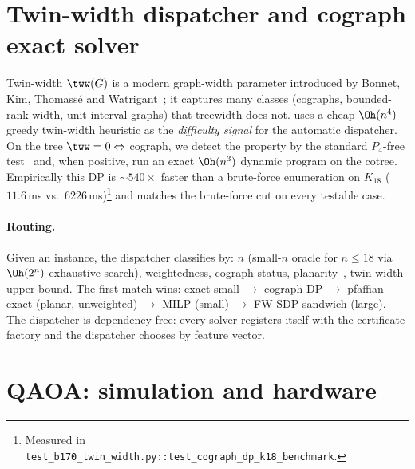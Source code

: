 \documentclass{article}
\begin{document}
\section{Twin-width dispatcher and cograph exact solver}
\label{sec:dispatcher}

Twin-width $\tww(G)$ is a modern graph-width parameter
introduced by Bonnet, Kim, Thomass{\'e} and
Watrigant~\cite{bonnet2022twin}; it captures many classes (cographs,
bounded-rank-width, unit interval graphs) that treewidth does not.
\ZornQ uses a cheap $\Oh(n^4)$ greedy twin-width heuristic as the
\emph{difficulty signal} for the automatic dispatcher. On the tree
$\tww = 0 \Leftrightarrow$ cograph, we detect the property by the
standard $P_4$-free test~\cite{corneil1981linear} and, when positive,
run an exact $\Oh(n^3)$ \MaxCut dynamic program on the cotree.
Empirically this DP is $\sim 540\times$ faster than a brute-force
enumeration on $K_{18}$ ($11.6$\,ms vs.\ $6226$\,ms)\footnote{Measured in \texttt{test\_b170\_twin\_width.py::test\_cograph\_dp\_k18\_benchmark}.} and matches the
brute-force cut on every testable case.

\begin{sloppypar}
\paragraph{Routing.} Given an instance, the dispatcher classifies by:
$n$ (small-$n$ oracle for $n \le 18$ via $\Oh(2^n)$ exhaustive search),
weightedness, cograph-status, planarity~\cite{kasteleyn1963dimer,hadlock1975finding},
twin-width upper bound. The first match wins: exact-small $\to$
cograph-DP $\to$ pfaffian-exact (planar, unweighted) $\to$ MILP (small)
$\to$ FW-SDP sandwich (large). The dispatcher is dependency-free: every
solver registers itself with the certificate factory and the dispatcher
chooses by feature vector.
\end{sloppypar}

\section{QAOA: simulation and hardware}
\label{sec:qaoa}
\end{document}

